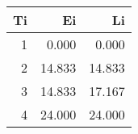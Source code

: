 \begin{tabular}{rrr}
\toprule
Ti & Ei & Li \\
\midrule
1 & 0.000 & 0.000 \\
2 & 14.833 & 14.833 \\
3 & 14.833 & 17.167 \\
4 & 24.000 & 24.000 \\
\bottomrule
\end{tabular}
